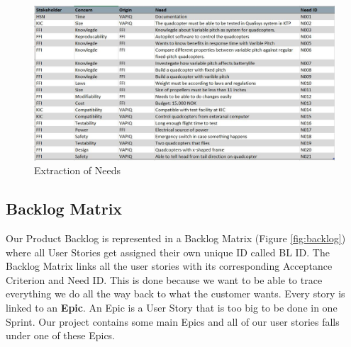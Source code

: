 \begin{figure}[h]
    \centering
        \includegraphics[width = 1\textwidth]{VAPIQ-PICTURES/Needs}
    \caption{Extraction of Needs}
    \label{fig:needs}
\end{figure}
\newpage

\subsection{Backlog Matrix}
Our Product Backlog is represented in a Backlog Matrix (Figure \ref{fig:backlog}) where all User Stories get assigned their own unique ID called BL ID. The Backlog Matrix links all the user stories with its corresponding Acceptance Criterion and Need ID. This is done because we want to be able to trace everything we do all the way back to what the customer wants. Every story is linked to an \textbf{Epic}. An Epic is a User Story that is too big to be done in one Sprint. Our project contains some main Epics and all of our user stories falls under one of these Epics. 


